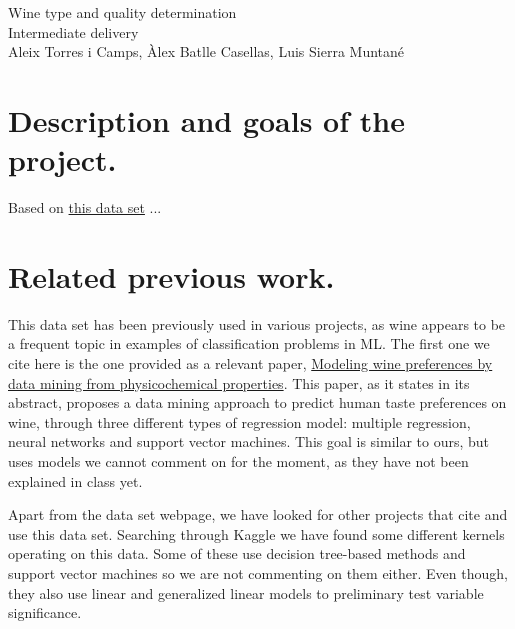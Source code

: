 \documentclass[10pt]{article}
\begin{document}
\begingroup
  \centering
  \Huge Wine type and quality determination \\
  \vskip 0.35cm
  \LARGE Intermediate delivery\\
  \vskip 0.25cm
  \large Aleix Torres i Camps, Àlex Batlle Casellas, Luis Sierra Muntané\\[1.5em]
\endgroup


\section{Description and goals of the project.}
Based on \href{http://archive.ics.uci.edu/ml/datasets/Wine+Quality}{this data set} ...

\section{Related previous work.}
This data set has been previously used in various projects, as wine appears to be a frequent topic in examples of classification problems in ML. The first one we cite here is the one provided as a relevant paper, \href{https://www.sciencedirect.com/science/article/pii/S0167923609001377?via\%3Dihub}{Modeling wine preferences by data mining from physicochemical properties}. This paper, as it states in its abstract, proposes a data mining approach to predict human taste preferences on wine, through three different types of regression model: multiple regression, neural networks and support vector machines. This goal is similar to ours, but uses models we cannot comment on for the moment, as they have not been explained in class yet.

Apart from the data set webpage, we have looked for other projects that cite and use this data set. Searching through Kaggle we have found some different kernels operating on this data. Some of these use decision tree-based methods and support vector machines so we are not commenting on them either. Even though, they also use linear and generalized linear models to preliminary test variable significance.
\end{document}
